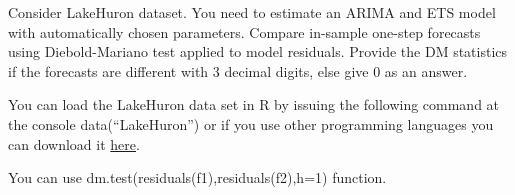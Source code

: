 
\begin{question}
Consider LakeHuron dataset. You need to estimate an ARIMA and ETS model with automatically chosen parameters. Compare in-sample one-step forecasts using Diebold-Mariano test applied to model residuals. Provide the DM statistics if the forecasts are different with 3 decimal digits, else give 0 as an answer.

You can load the LakeHuron data set in R by issuing the following command at the console data(``LakeHuron'') or if you use other programming languages you can download it \href{https://github.com/vincentarelbundock/Rdatasets/blob/master/csv/datasets/LakeHuron.csv}{here}.
\end{question}

\begin{solution}
You can use dm.test(residuals(f1),residuals(f2),h=1) function.
\end{solution}


